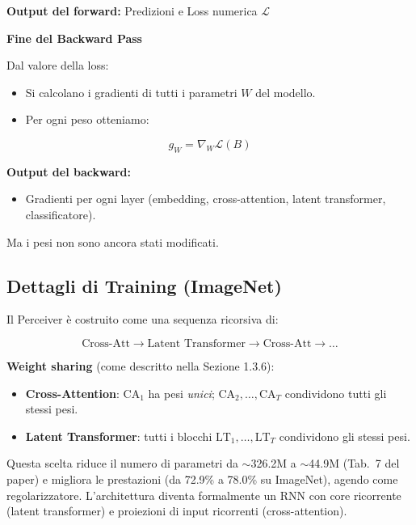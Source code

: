 \documentclass[
  11pt,
]{article}
\begin{document}
\textbf{Output del forward:} Predizioni e Loss numerica \(\mathcal{L}\)

\textbf{Fine del Backward Pass}

Dal valore della loss:

\begin{itemize}
\item
  Si calcolano i gradienti di tutti i parametri \(W\) del modello.
\item
  Per ogni peso otteniamo:
\end{itemize}

\[g_{W} = \nabla_{W}\mathcal{L}(B)\]

\textbf{Output del backward:}

\begin{itemize}
\item
  Gradienti per ogni layer (embedding, cross-attention, latent
  transformer, classificatore).
\end{itemize}

Ma i pesi non sono ancora stati modificati.

\subsection{Dettagli di Training (ImageNet)}

Il Perceiver è costruito come una sequenza ricorsiva di:

\[\text{Cross-Att} \rightarrow \text{Latent Transformer} \rightarrow \text{Cross-Att} \rightarrow \ldots\]

\textbf{Weight sharing} (come descritto nella Sezione 1.3.6):
\begin{itemize}
\item \textbf{Cross-Attention}: $\text{CA}_1$ ha pesi \emph{unici}; $\text{CA}_2, \ldots, \text{CA}_T$ condividono tutti gli stessi pesi.
\item \textbf{Latent Transformer}: tutti i blocchi $\text{LT}_1, \ldots, \text{LT}_T$ condividono gli stessi pesi.
\end{itemize}

Questa scelta riduce il numero di parametri da $\sim$326.2M a $\sim$44.9M (Tab.\ 7 del paper) e migliora le prestazioni (da 72.9\% a 78.0\% su ImageNet), agendo come regolarizzatore. L'architettura diventa formalmente un RNN con core ricorrente (latent transformer) e proiezioni di input ricorrenti (cross-attention).
\end{document}

